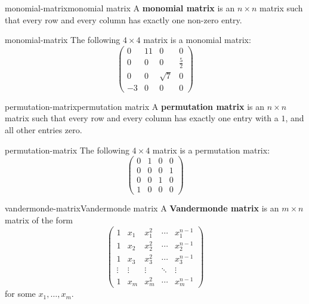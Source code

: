 \begin{topic}{monomial-matrix}{monomial matrix}
    A \textbf{monomial matrix} is an $n \times n$ matrix such that every row and every column has exactly one non-zero entry.
\end{topic}

\begin{example}{monomial-matrix}
    The following $4 \times 4$ matrix is a monomial matrix:
    \[ \begin{pmatrix} 0 & 11 & 0 & 0 \\ 0 & 0 & 0 & \frac{5}{2} \\ 0 & 0 & \sqrt{7} & 0 \\ -3 & 0 & 0 & 0 \end{pmatrix} \]
\end{example}

\begin{topic}{permutation-matrix}{permutation matrix}
    A \textbf{permutation matrix} is an $n \times n$ matrix such that every row and every column has exactly one entry with a $1$, and all other entries zero.
\end{topic}

\begin{example}{permutation-matrix}
    The following $4 \times 4$ matrix is a permutation matrix:
    \[ \begin{pmatrix} 0 & 1 & 0 & 0 \\ 0 & 0 & 0 & 1 \\ 0 & 0 & 1 & 0 \\ 1 & 0 & 0 & 0 \end{pmatrix} \]
\end{example}

\begin{topic}{vandermonde-matrix}{Vandermonde matrix}
    A \textbf{Vandermonde matrix} is an $m \times n$ matrix of the form
    \[ \begin{pmatrix} 1 & x_1 & x_1^2 & \cdots & x_1^{n - 1} \\ 1 & x_2 & x_2^2 & \cdots & x_2^{n - 1} \\ 1 & x_3 & x_3^2 & \cdots & x_3^{n - 1} \\ \vdots & \vdots & \vdots & \ddots & \vdots \\ 1 & x_m & x_m^2 & \cdots & x_m^{n - 1} \end{pmatrix} \]
    for some $x_1, \ldots, x_m$.
\end{topic}


